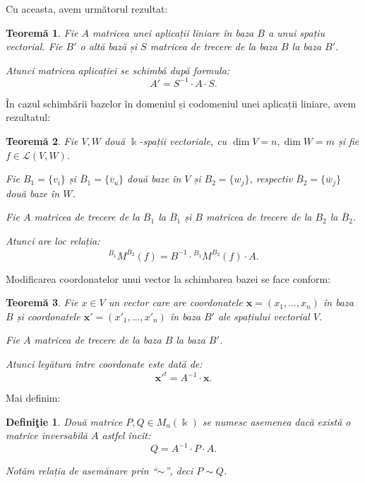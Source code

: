 \documentclass[11pt,a4paper]{article}
\newcommand\kal{\mathcal}
\theoremstyle{dotless}
\newtheorem{theorem}{Teorem\u{a}}[section]
\theoremstyle{dotlessdr}
\newtheorem{definition}{Defini\c{t}ie}[section]
\begin{document}
Cu aceasta, avem următorul rezultat:
\begin{theorem}\label{thm:sch-trecere}
  Fie $A$ matricea unei aplicații liniare în baza $B$ a unui spațiu vectorial.
  Fie $B'$ o altă bază și $S$ matricea de trecere de la baza $B$ la baza $B'$.

  Atunci matricea aplicației se schimbă după formula:
  \[
    A' = S^{-1} \cdot A \cdot S.
  \]
\end{theorem}

În cazul schimbării bazelor în domeniul și codomeniul unei aplicații
liniare, avem rezultatul:

\begin{theorem}\label{thm:mat-trecere-ambele}
  Fie $V, W$ două $\Bbbk$-spații vectoriale, cu $\dim V = n, \dim W = m$ și
  fie $f \in \kal{L}(V, W)$.

  Fie $B_1 = \{v_i\}$ și $\overline{B}_1 = \{\overline{v}_u\}$ două baze
  în $V$ și $B_2 = \{w_j\}$, respectiv $\overline{B}_2 = \{ \overline{w}_j \}$
  două baze în $W$.

  Fie $A$ matricea de trecere de la $B_1$ la $\overline{B}_1$ și $B$ matricea
  de trecere de la $B_2$ la $\overline{B}_2$.

  Atunci are loc relația:
  \[
    {}^{\overline{B}_1} M^{\overline{B}_2} (f) =
    B^{-1} \cdot {}^{B_1} M^{B_2} (f) \cdot A.
  \]
\end{theorem}

Modificarea coordonatelor unui vector la schimbarea bazei se face conform:

\begin{theorem}\label{thm:sch-coord}
  Fie $x \in V$ un vector care are coordonatele $\pmb{x} = (x_1, \dots, x_n)$ în
  baza $B$ și coordonatele $\pmb{x'} = (x'_1, \dots, x'_n)$ în baza $B'$ ale spațiului
  vectorial $V$.

  Fie $A$ matricea de trecere de la baza $B$ la baza $B'$.

  Atunci legătura între coordonate este dată de:
  \[
    \pmb{x'}^t = A^{-1} \cdot \pmb{x}.
  \]
\end{theorem}

Mai definim:

\begin{definition}\label{def:mat-asemenea}
  Două matrice $P, Q \in M_n(\Bbbk)$ se numesc \emph{asemenea} dacă există o matrice
  inversabilă $A$ astfel încît:
  \[
    Q = A^{-1} \cdot P \cdot A.
  \]

  Notăm relația de asemănare prin ``$\sim$'', deci $P \sim Q$.
\end{definition}
\end{document}
